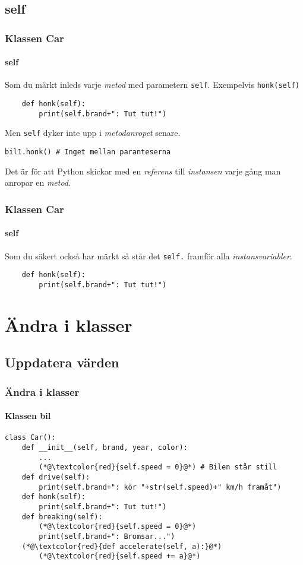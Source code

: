 \documentclass[aspectratio=169]{beamer}
\begin{document}
\subsection{self}

\begin{frame}[fragile]
	\frametitle{Klassen Car}
	\framesubtitle{self}
	
	Som du märkt inleds varje \textit{metod} med parametern \texttt{self}. Exempelvis \texttt{honk(self)}
	
	\begin{lstlisting}
    def honk(self):
        print(self.brand+": Tut tut!")
	\end{lstlisting}
	
	Men \texttt{self} dyker inte upp i \textit{metodanropet} senare.
	
	\begin{lstlisting}
bil1.honk() # Inget mellan paranteserna
	\end{lstlisting}
	
	Det är för att Python skickar med en \textit{referens} till \textit{instansen} varje gång man anropar en \textit{metod}.

\end{frame}

\begin{frame}[fragile]
	\frametitle{Klassen Car}
	\framesubtitle{self}
	
	Som du säkert också har märkt så står det \texttt{self.} framför alla \textit{instansvariabler}.
	
	\begin{lstlisting}
    def honk(self):
        print(self.brand+": Tut tut!")
	\end{lstlisting}
	
	

\end{frame}

\section{Ändra i klasser}

\subsection{Uppdatera värden}

\begin{frame}[fragile]
	\frametitle{Ändra i klasser}
	\framesubtitle{Klassen bil}
	
	\begin{lstlisting}
class Car():
    def __init__(self, brand, year, color):
        ...
        (*@\textcolor{red}{self.speed = 0}@*) # Bilen står still
    def drive(self):
        print(self.brand+": kör "+str(self.speed)+" km/h framåt")
    def honk(self):
        print(self.brand+": Tut tut!")
    def breaking(self):
        (*@\textcolor{red}{self.speed = 0}@*)
        print(self.brand+": Bromsar...")
    (*@\textcolor{red}{def accelerate(self, a):}@*)
        (*@\textcolor{red}{self.speed += a}@*)
	\end{lstlisting}	
	
\end{frame}
\end{document}
